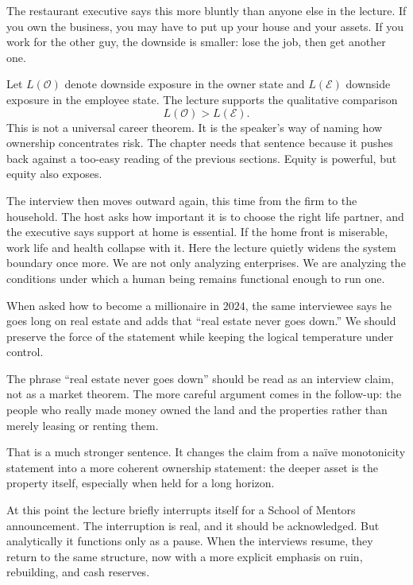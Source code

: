 The restaurant executive says this more bluntly than anyone else in the lecture. If you own the business, you may have to put up your house and your assets. If you work for the other guy, the downside is smaller: lose the job, then get another one.

Let \(L(\mathcal{O})\) denote downside exposure in the owner state and \(L(\mathcal{E})\) downside exposure in the employee state. The lecture supports the qualitative comparison
\begin{equation}
L(\mathcal{O}) > L(\mathcal{E}).
\end{equation}
This is not a universal career theorem. It is the speaker's way of naming how ownership concentrates risk. The chapter needs that sentence because it pushes back against a too-easy reading of the previous sections. Equity is powerful, but equity also exposes.

The interview then moves outward again, this time from the firm to the household. The host asks how important it is to choose the right life partner, and the executive says support at home is essential. If the home front is miserable, work life and health collapse with it. Here the lecture quietly widens the system boundary once more. We are not only analyzing enterprises. We are analyzing the conditions under which a human being remains functional enough to run one.

When asked how to become a millionaire in \(2024\), the same interviewee says he goes long on real estate and adds that ``real estate never goes down.'' We should preserve the force of the statement while keeping the logical temperature under control.

\begin{remark}
The phrase ``real estate never goes down'' should be read as an interview claim, not as a market theorem. The more careful argument comes in the follow-up: the people who really made money owned the land and the properties rather than merely leasing or renting them.
\end{remark}

That is a much stronger sentence. It changes the claim from a naïve monotonicity statement into a more coherent ownership statement: the deeper asset is the property itself, especially when held for a long horizon.

At this point the lecture briefly interrupts itself for a School of Mentors announcement. The interruption is real, and it should be acknowledged. But analytically it functions only as a pause. When the interviews resume, they return to the same structure, now with a more explicit emphasis on ruin, rebuilding, and cash reserves.

